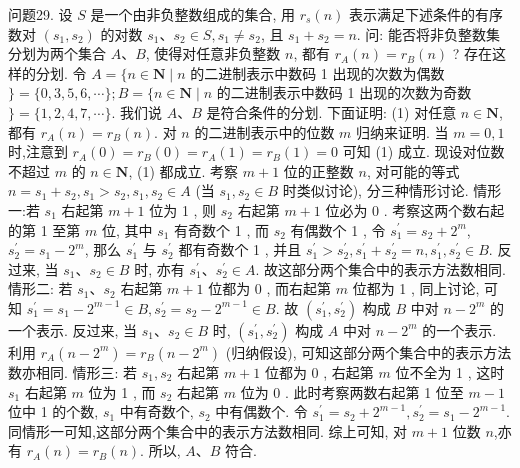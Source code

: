 问题29. 设 $S$ 是一个由非负整数组成的集合, 用 $r_s(n)$ 表示满足下述条件的有序数对 $\left(s_1, s_2\right)$ 的对数 $s_1 、 s_2 \in S, s_1 \neq s_2$, 且 $s_1+s_2=n$.
问: 能否将非负整数集分划为两个集合 $A 、 B$, 使得对任意非负整数 $n$, 都有 $r_A(n)=r_B(n)$ ?
存在这样的分划.
令 $A=\{n \in \mathbf{N} \mid n$ 的二进制表示中数码 1 出现的次数为偶数 $\}=\{0,3,5,6, \cdots\} ; B=\{n \in \mathbf{N} \mid n$ 的二进制表示中数码 1 出现的次数为奇数 $\}=\{1,2,4,7, \cdots\}$. 我们说 $A 、 B$ 是符合条件的分划.
下面证明: (1) 对任意 $n \in \mathbf{N}$, 都有 $r_A(n)=r_B(n)$.
对 $n$ 的二进制表示中的位数 $m$ 归纳来证明.
当 $m=0,1$ 时,注意到 $r_A(0)=r_B(0)=r_A(1)=r_B(1)=0$ 可知 (1) 成立.
现设对位数不超过 $m$ 的 $n \in \mathbf{N}$, (1) 都成立.
考察 $m+1$ 位的正整数 $n$, 对可能的等式 $n=s_1+s_2, s_1>s_2, s_1, s_2 \in A$ (当 $s_1, s_2 \in B$ 时类似讨论), 分三种情形讨论.
情形一:若 $s_1$ 右起第 $m+1$ 位为 1 , 则 $s_2$ 右起第 $m+1$ 位必为 0 . 考察这两个数右起的第 1 至第 $m$ 位, 其中 $s_1$ 有奇数个 1 , 而 $s_2$ 有偶数个 1 , 令 $s_1^{\prime}=s_2+2^m$, $s_2^{\prime}=s_1-2^m$, 那么 $s_1^{\prime}$ 与 $s_2^{\prime}$ 都有奇数个 1 , 并且 $s_1^{\prime}>s_2^{\prime}, s_1^{\prime}+s_2^{\prime}=n, s_1^{\prime}, s_2^{\prime} \in B$. 反过来, 当 $s_1 、 s_2 \in B$ 时, 亦有 $s_1^{\prime} 、 s_2^{\prime} \in A$. 故这部分两个集合中的表示方法数相同.
情形二: 若 $s_1 、 s_2$ 右起第 $m+1$ 位都为 0 , 而右起第 $m$ 位都为 1 , 同上讨论, 可知 $s_1^{\prime}=s_1-2^{m-1} \in B, s_2^{\prime}=s_2-2^{m-1} \in B$. 故 $\left(s_1^{\prime}, s_2^{\prime}\right)$ 构成 $B$ 中对 $n-2^m$ 的一个表示.
反过来, 当 $s_1 、 s_2 \in B$ 时, $\left(s_1^{\prime}, s_2^{\prime}\right)$ 构成 $A$ 中对 $n-2^m$ 的一个表示.
利用 $r_A\left(n-2^m\right)=r_B\left(n-2^m\right)$ (归纳假设), 可知这部分两个集合中的表示方法数亦相同.
情形三: 若 $s_1, s_2$ 右起第 $m+1$ 位都为 0 , 右起第 $m$ 位不全为 1 , 这时 $s_1$ 右起第 $m$ 位为 1 , 而 $s_2$ 右起第 $m$ 位为 0 . 此时考察两数右起第 1 位至 $m-1$ 位中 1 的个数, $s_1$ 中有奇数个, $s_2$ 中有偶数个.
令 $s_1^{\prime}=s_2+2^{m-1}, s_2^{\prime}=s_1-2^{m-1}$. 同情形一可知,这部分两个集合中的表示方法数相同.
综上可知, 对 $m+1$ 位数 $n$,亦有 $r_A(n)=r_B(n)$. 所以, $A 、 B$ 符合.



